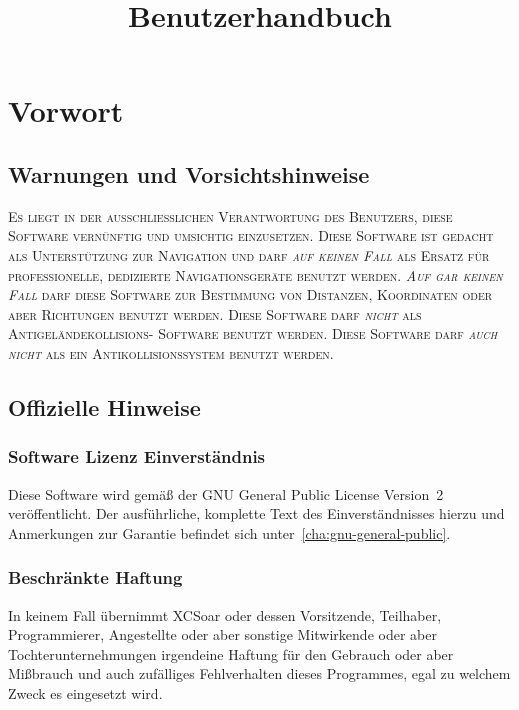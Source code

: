 \documentclass[german,a4paper,10pt]{refrep}
\title{Benutzerhandbuch}%
\begin{document}
\sloppy%
%
\maketitle
\begingroup\setlength{\parskip}{0.1\baselineskip}\tableofcontents\endgroup
\chapter*{Vorwort}
\section*{Warnungen und Vorsichtshinweise}
%
\warning
\textsc{Es liegt in der ausschließlichen Verantwortung des Benutzers, diese Software vernünftig
und umsichtig einzusetzen. Diese Software ist gedacht als Unterstützung zur Navigation
und darf \emph{auf keinen Fall} als Ersatz für professionelle, dedizierte Navigationsgeräte benutzt
werden. \emph{Auf gar keinen Fall} darf diese Software zur Bestimmung von Distanzen, Koordinaten
oder aber Richtungen benutzt werden. Diese Software darf \emph{nicht} als Antigeländekollisions- Software benutzt werden.
Diese Software darf \emph{auch nicht} als ein Antikollisionssystem benutzt werden.}
%
\section*{Offizielle Hinweise}
\subsection*{Software Lizenz Einverständnis}
%
Diese Software wird gemäß der GNU General Public License Version~2 veröffentlicht. Der ausführliche,
komplette Text des Einverständnisses hierzu und Anmerkungen zur Garantie befindet sich
unter~\ref{cha:gnu-general-public}.
%
\subsection*{Beschränkte Haftung}
In keinem Fall übernimmt XCSoar oder dessen Vorsitzende, Teilhaber, Programmierer, Angestellte  oder aber sonstige Mitwirkende  oder aber  Tochterunternehmungen irgendeine Haftung für den Gebrauch oder aber Mißbrauch und auch zufälliges Fehlverhalten dieses Programmes, egal zu welchem Zweck es eingesetzt wird.
%
\end{document}
